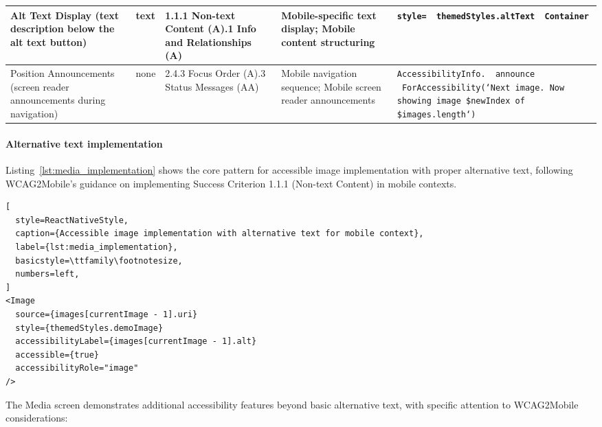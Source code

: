 \begin{longtable}[c]{|C{2.5cm}|C{2cm}|C{2.8cm}|C{2.8cm}|C{4.7cm}|}
\hline
Alt Text Display (text description below the alt text button) & text & 1.1.1 Non-text Content (A).1 Info and Relationships (A) & Mobile-specific text display; Mobile content structuring & \texttt{style= \ themedStyles.altText \ Container} \\
\hline
Position Announcements (screen reader announcements during navigation) & none & 2.4.3 Focus Order (A).3 Status Messages (AA) & Mobile navigation sequence; Mobile screen reader announcements & \texttt{AccessibilityInfo. \ announce \ ForAccessibility(`Next image. Now showing image \${newIndex} of \${images.length}`)} \\
\end{longtable}
\FloatBarrier

\paragraph{Alternative text implementation}

Listing~\ref{lst:media_implementation} shows the core pattern for accessible image implementation with proper alternative text, following WCAG2Mobile's guidance on implementing Success Criterion 1.1.1 (Non-text Content) in mobile contexts.

\begin{lstlisting}[
  style=ReactNativeStyle,
  caption={Accessible image implementation with alternative text for mobile context},
  label={lst:media_implementation},
  basicstyle=\ttfamily\footnotesize,
  numbers=left,
]
<Image
  source={images[currentImage - 1].uri}
  style={themedStyles.demoImage}
  accessibilityLabel={images[currentImage - 1].alt}
  accessible={true}
  accessibilityRole="image"
/>
\end{lstlisting}
\FloatBarrier

The Media screen demonstrates additional accessibility features beyond basic alternative text, with specific attention to WCAG2Mobile considerations:

